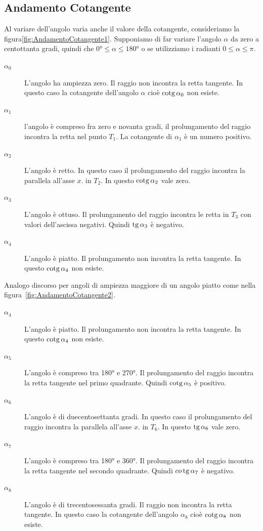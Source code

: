 \subsection{Andamento Cotangente}
\label{sec:AndamentoCotangente}
Al variare dell'angolo varia anche il valore della cotangente, consideriamo la figura\nobs\vref{fig:AndamentoCotangente1}. Supponiamo di far variare l'angolo $\alpha$ da zero a centottanta gradi, quindi che $\ang{0}\leq\alpha\leq\ang{180}$ o se utilizziamo i radianti $0\leq\alpha\leq\pi$. 
\begin{description}
	\item[$\alpha_0$] L'angolo ha ampiezza zero. Il raggio non incontra la retta tangente. In questo caso  la cotangente  dell'angolo $\alpha$ cioè $\operatorname{cotg}\alpha_0$  non esiste.
	\item [$\alpha_1$] l'angolo è compreso fra zero e novanta gradi, il prolungamento del raggio  incontra la retta nel punto $T_1$. La cotangente di $\alpha_1$ è un numero positivo.
	\item [$\alpha_2$] L'angolo  è retto. In questo caso il prolungamento del raggio incontra la parallela all'asse $x$. in $T_2$. In questo    $\operatorname{cotg}\alpha_2$ vale zero. 
	\item [$\alpha_3$]  L'angolo è ottuso. Il prolungamento del raggio incontra le retta in $T_3$  con valori dell'ascissa negativi. Quindi $\operatorname{tg}\alpha_3$ è negativo.
	\item [$\alpha_4$] L'angolo  è  piatto. Il  prolungamento non incontra la retta tangente. In questo  $\operatorname{cotg}\alpha_4$ non esiste.
\end{description}
Analogo discorso per angoli di ampiezza  maggiore di un angolo  piatto come nella figura~\vref{fig:AndamentoCotangente2}.
\begin{description}
	\item [$\alpha_4$] L'angolo  è  piatto. Il  prolungamento non incontra la retta tangente. In questo  $\operatorname{cotg}\alpha_4$ non esiste.
	\item [$\alpha_5$] L'angolo è compreso tra \ang{180} e \ang{270}. Il prolungamento del raggio incontra la retta tangente  nel primo quadrante. Quindi $\operatorname{cotg}\alpha_5$ è positivo.
	\item [$\alpha_6$] L'angolo è di duecentosettanta gradi.  In questo caso il prolungamento del raggio incontra la parallela all'asse $x$. in $T_6$. In questo    $\operatorname{tg}\alpha_6$ vale zero. 
	\item [$\alpha_7$] L'angolo è compreso tra \ang{180} e \ang{360}. Il prolungamento del raggio incontra la retta tangente nel secondo quadrante. Quindi $co\operatorname{tg}\alpha_7$ è negativo.
	\item [$\alpha_8$] L'angolo è di trecentosessanta gradi. Il raggio non incontra la retta tangente. In questo caso  la cotangente  dell'angolo $\alpha_8$ cioè $\operatorname{cotg}\alpha_8$  non esiste.
\end{description}
